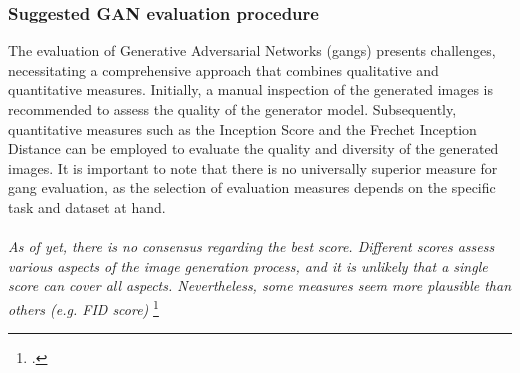\subsubsection{Suggested GAN evaluation procedure}
\label{subsubsec:suggested-gan-evaluation-procedure}
The evaluation of Generative Adversarial Networks (\gls{gang}s) presents challenges, necessitating a comprehensive approach that combines qualitative and quantitative measures. 
Initially, a manual inspection of the generated images is recommended to assess the quality of the generator model. Subsequently, quantitative measures such as the Inception Score and the Frechet Inception Distance can be employed to evaluate the quality and diversity of the generated images. 
It is important to note that there is no universally superior measure for \gls{gang} evaluation, as the selection of evaluation measures depends on the specific task and dataset at hand.\\\\
\emph{
    As of yet, there is no consensus regarding the best score. Different scores assess various aspects of the image generation process, and it is unlikely that a single score can cover all aspects. Nevertheless, some measures seem more plausible than others (e.g. FID score)
}\footcite{paper:ganeval}
